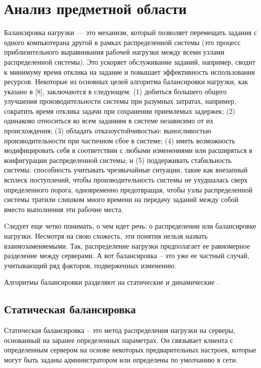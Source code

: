 \chapter{Анализ предметной области}

Балансировка нагрузки --- это механизм, который позволяет перемещать задания с одного компьютерана другой в рамках распределенной системы (это процесс приблизительного выравнивания рабочей нагрузки между всеми узлами распределенной системы).
Это ускоряет обслуживание заданий, например, сводит к минимуму время отклика на задание и повышает эффективность использования ресурсов.
Некоторые из основных целей алгоритма балансировки нагрузки, как указано в [8], заключаются в следующем: (1) добиться большего общего улучшения производительности системы при разумных затратах, например, сократить время отклика задачи при сохранении приемлемых задержек; (2) одинаково относиться ко всем заданиям в системе независимо от их происхождения; (3) обладать отказоустойчивостью:
выносливостью производительности при частичном сбое в системе; (4) иметь возможность модифицировать себя в соответствии с любыми изменениями или расширяться в конфигурации распределенной системы; и (5) поддерживать стабильность системы: способность учитывать чрезвычайные ситуации, такие как внезапный всплеск поступлений, чтобы производительность системы не ухудшалась сверх определенного порога, одновременно предотвращая, чтобы узлы распределенной системы тратили слишком много времени на передачу заданий между собой вместо выполнения эти рабочие места. \cite{4}	

Cледует еще четко понимать, о чем идет речь: о распределении или балансировке нагрузки. Несмотря на свою схожесть, эти понятия нельзя назвать взаимозаменяемыми. Так, распределение нагрузки предполагает ее равномерное разделение между серверами. А вот балансировка – это уже ее частный случай, учитывающий ряд факторов, подверженных изменению. \cite{4}

Алгоритмы балансировки разделяют на статические и динамические \cite{uzel}.
\section{Статическая балансировка}
Статическая балансировка – это метод распределения нагрузки на серверы, основанный на заранее определенных параметрах. Он связывает клиента с определенным сервером на основе некоторых предварительных настроек, которые могут быть заданы администратором или определены по умолчанию в сети.

